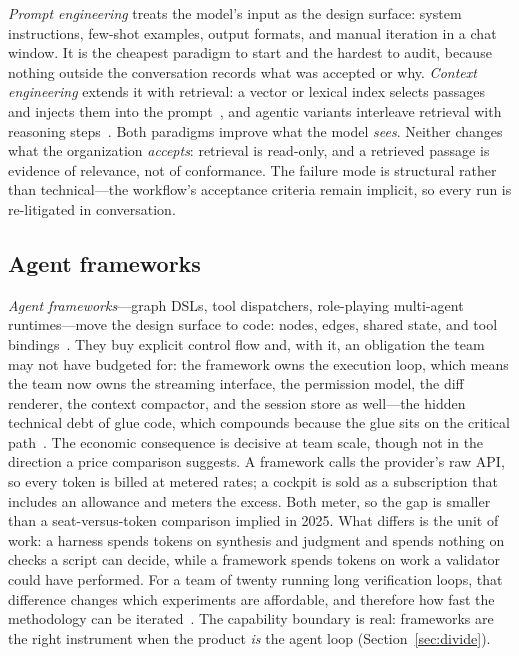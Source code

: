 \documentclass[10pt,a4paper]{article}
\theoremstyle{definition}
\theoremstyle{plain}
\theoremstyle{principle}
\begin{document}
\emph{Prompt engineering} treats the model's input as the design surface: system instructions,
few-shot examples, output formats, and manual iteration in a chat window. It is the cheapest
paradigm to start and the hardest to audit, because nothing outside the conversation records what
was accepted or why. \emph{Context engineering} extends it with retrieval: a vector or lexical
index selects passages and injects them into the prompt~\cite{lewis2020rag}, and agentic variants
interleave retrieval with reasoning steps~\cite{react}. Both paradigms improve what the model
\emph{sees}. Neither changes what the organization \emph{accepts}: retrieval is read-only, and a
retrieved passage is evidence of relevance, not of conformance. The failure mode is structural
rather than technical---the workflow's acceptance criteria remain implicit, so every run is
re-litigated in conversation.

\subsection{Agent frameworks}

\emph{Agent frameworks}---graph DSLs, tool dispatchers, role-playing multi-agent runtimes---move
the design surface to code: nodes, edges, shared state, and tool bindings~\cite{langgraph,crewai,autogen}.
They buy explicit control flow and, with it, an obligation the team may not have budgeted for:
the framework owns the execution loop, which means the team now owns the streaming interface, the
permission model, the diff renderer, the context compactor, and the session store as well---the
hidden technical debt of glue code, which compounds because the glue sits on the critical
path~\cite{sculley2015}. The economic consequence is decisive at team scale, though not in the
direction a price comparison suggests. A framework calls the provider's raw API, so every token is
billed at metered rates; a cockpit is sold as a subscription that includes an allowance and meters
the excess. Both meter, so the gap is smaller than a seat-versus-token comparison implied in 2025.
What differs is the unit of work: a harness spends tokens on synthesis and judgment and spends
nothing on checks a script can decide, while a framework spends tokens on work a validator could
have performed. For a team of twenty running long verification loops, that difference changes which
experiments are affordable, and therefore how fast the methodology can be
iterated~\cite{brooks1975,forsgren2018}. The capability boundary is real: frameworks are the right
instrument when the product \emph{is} the agent loop (Section~\ref{sec:divide}).
\end{document}

